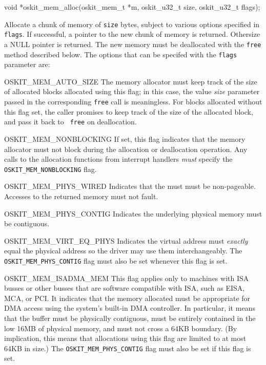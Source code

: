 \begin{apisyn}

	\funcproto void *oskit_mem_alloc(oskit_mem_t *m, 
				oskit_u32_t size, oskit_u32_t flags);
\end{apisyn}
\begin{apidesc}
	Allocate a chunk of memory of \texttt{size} bytes, subject to
	various options specified in \texttt{flags}. If successful, a
	pointer to the new chunk of memory is returned. Othersize a NULL
	pointer is returned. The new memory must be deallocated with the
	\texttt{free} method described below. The options that can be
	specifed with the \texttt{flags} parameter are:
	\begin{icsymlist}
	\item[OSKIT_MEM_AUTO_SIZE]
		The memory allocator must keep track of the size of
		allocated blocks allocated using this flag; in this case,
		the value \emph{size} parameter passed in the corresponding
		{\tt free} call is meaningless.  For blocks allocated
		without this flag set, the caller promises to keep track of
		the size of the allocated block, and pass it back to {\tt
		free} on deallocation.
	\item[OSKIT_MEM_NONBLOCKING]
		If set, this flag indicates that the memory allocator must
		not block during the allocation or deallocation operation.
		Any calls to the allocation functions from interrupt
		handlers \emph{must} specify the {\tt OSKIT_MEM_NONBLOCKING}
		flag.
	\item[OSKIT_MEM_PHYS_WIRED]
		Indicates that the must must be non-pageable.  Accesses to
		the returned memory must not fault.
	\item[OSKIT_MEM_PHYS_CONTIG]
		Indicates the underlying physical memory must be
		contiguous.
	\item[OSKIT_MEM_VIRT_EQ_PHYS]
		Indicates the virtual address must \emph{exactly} equal the
		physical address so the driver may use them
		interchangeably.  The {\tt OSKIT_MEM_PHYS_CONTIG} flag must
		also be set whenever this flag is set.
	\item[OSKIT_MEM_ISADMA_MEM]
		This flag applies only to machines with ISA busses or other
		busses that are software compatible with ISA, such as EISA,
		MCA, or PCI\@.  It indicates that the memory allocated must
		be appropriate for DMA access using the system's built-in
		DMA controller.  In particular, it means that the buffer
		must be physically contiguous, must be entirely contained
		in the low 16MB of physical memory, and must not cross a
		64KB boundary.  (By implication, this means that
		allocations using this flag are limited to at most 64KB in
		size.)  The {\tt OSKIT_MEM_PHYS_CONTIG} flag must also be set
		if this flag is set.
	\end{icsymlist}
\end{apidesc}

